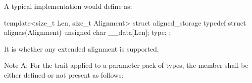 %
\pnum
\begin{note} A typical implementation would define  as:

\begin{codeblock}
template<size_t Len, size_t Alignment>
struct aligned_storage {
  typedef struct {
    alignas(Alignment) unsigned char __data[Len];
  } type;
};
\end{codeblock}
\end{note}

\pnum
It is  whether any extended alignment is
supported.

%
\pnum
Note A:
For the  trait applied to a parameter pack  of types,
the member  shall be either defined or not present as follows:

